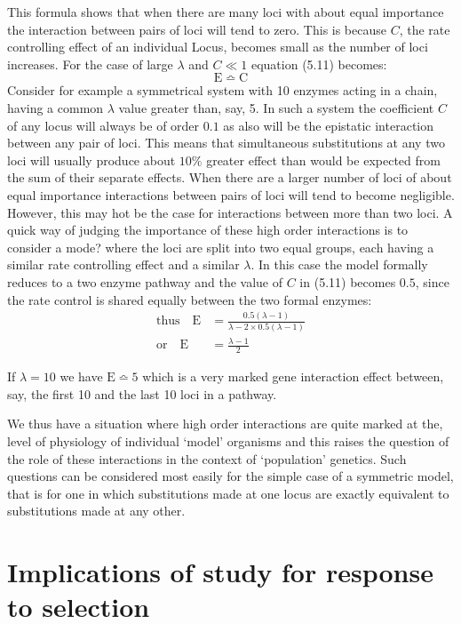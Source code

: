 This formula shows that when there are many loci with about equal importance the interaction between pairs of loci will tend to zero. This is because $C$, the rate controlling effect of an individual Locus, becomes small as the number of loci increases. For the case of large $\lambda$ and $C \ll 1$ equation (5.11) becomes:
%
$$
\mathrm{E} \bumpeq \mathrm{C}
$$
%
Consider for example a symmetrical system with 10 enzymes acting in a chain, having a common $\lambda$ value greater than, say, 5. In such a system the coefficient $C$ of any locus will always be of order $0.1$ as also will be the epistatic interaction between any pair of loci. This means that simultaneous substitutions at any two loci will usually produce about $10 \%$ greater effect than would be expected from the sum of their separate effects. When there are a larger number of loci of about equal importance interactions between pairs of loci will tend to become negligible. However, this may hot be the case for interactions between more than two loci. A quick way of judging the importance of these high order interactions is to consider a mode? where the loci are split into two equal groups, each having a similar rate controlling effect and a similar $\lambda$. In this case the model formally reduces to a two enzyme pathway and the value of $C$ in (5.11) becomes $0.5$, since the rate control is shared equally between the two formal enzymes:
%
$$
\begin{aligned}
\mbox{thus} \quad \mathrm{E} &= \frac{0.5(\lambda-1)}{\lambda-2 \times 0.5(\lambda-1)} \\[5pt]
\mbox{or} \quad \mathrm{E} &= \frac{\lambda-1}{2}
\end{aligned}
$$

If $\lambda=10$ we have $\mathrm{E} \bumpeq 5$ which is a very marked gene interaction effect between, say, the first 10 and the last 10 loci in a pathway. 

We thus have a situation where high order interactions are quite marked at the, level of physiology of individual `model' organisms and this raises the question of the role of these interactions in the context of `population' genetics. Such questions can be considered most easily for the simple case of a symmetric model, that is for one in which substitutions made at one locus are exactly
equivalent to substitutions made at any other.

\section{Implications of study for response to selection}

